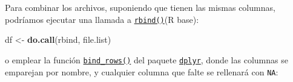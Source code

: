 \documentclass[
]{book}
\newenvironment{Shaded}{\begin{snugshade}}{\end{snugshade}}
\newcommand{\AttributeTok}[1]{\textcolor[rgb]{0.13,0.29,0.53}{#1}}
\newcommand{\CommentTok}[1]{\textcolor[rgb]{0.56,0.35,0.01}{\textit{#1}}}
\newcommand{\ControlFlowTok}[1]{\textcolor[rgb]{0.13,0.29,0.53}{\textbf{#1}}}
\newcommand{\FunctionTok}[1]{\textcolor[rgb]{0.13,0.29,0.53}{\textbf{#1}}}
\newcommand{\NormalTok}[1]{#1}
\newcommand{\OtherTok}[1]{\textcolor[rgb]{0.56,0.35,0.01}{#1}}
\newcommand{\SpecialCharTok}[1]{\textcolor[rgb]{0.81,0.36,0.00}{\textbf{#1}}}
\newcommand{\StringTok}[1]{\textcolor[rgb]{0.31,0.60,0.02}{#1}}
\begin{document}
\begin{Shaded}
\end{Shaded}

Para combinar los archivos, suponiendo que tienen las mismas columnas, podríamos ejecutar una llamada a \href{https://www.rdocumentation.org/packages/base/versions/3.6.1/topics/rbind}{\texttt{rbind()}}(R base):

\begin{Shaded}
\begin{Highlighting}[]
\NormalTok{df }\OtherTok{\textless{}{-}} \FunctionTok{do.call}\NormalTok{(}\StringTok{\textquotesingle{}rbind\textquotesingle{}}\NormalTok{, file.list)}
\end{Highlighting}
\end{Shaded}

o emplear la función \href{https://www.rdocumentation.org/packages/dplyr/versions/0.7.8/topics/bind}{\texttt{bind\_rows()}}
del paquete \href{https://dplyr.tidyverse.org}{\texttt{dplyr}}, donde las columnas se emparejan por nombre, y cualquier columna que falte se rellenará con \texttt{NA}:
\end{document}
